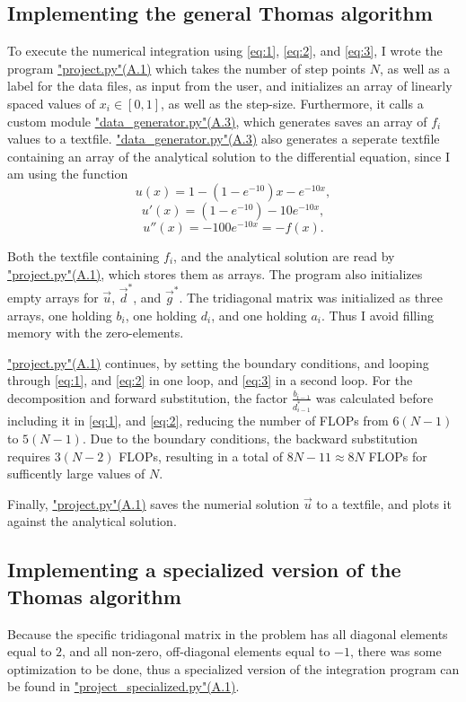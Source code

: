 \documentclass[english,notitlepage,reprint]{revtex4-1}  %
\begin{document}
\subsection{Implementing the general Thomas algorithm}\label{subsec:31}
To execute the numerical integration using \eqref{eq:1}, \eqref{eq:2}, and \eqref{eq:3}, I wrote the program \hyperref[A:1]{"project.py"(A.1)} which takes the number of step points \(N\), as well as a label for the data files, as input from the user, and initializes an array of linearly spaced values of \(x_{i}\in[0,1]\), as well as the step-size. Furthermore, it calls a custom module \hyperref[A:3]{"data\_generator.py"(A.3)}, which generates saves an array of \(f_{i}\) values to a textfile. \hyperref[A:3]{"data\_generator.py"(A.3)} also generates a seperate textfile containing an array of the analytical solution to the differential equation, since I am using the function
$$
	u(x) = 1-(1-e^{-10})x-e^{-10x},
$$
$$
	u'(x) = (1-e^{-10})-10e^{-10x},
$$
$$
	u''(x) = -100e^{-10x}=-f(x).
$$

Both the textfile containing \(f_{i}\), and the analytical solution are read by \hyperref[A:1]{"project.py"(A.1)}, which stores them as arrays. The program also initializes empty arrays for \(\vec{u}\), \(\vec{d}^{*}\), and \(\vec{g}^{*}\). The tridiagonal matrix was initialized as three arrays, one holding \(b_{i}\), one holding \(d_{i}\), and one holding \(a_{i}\). Thus I avoid filling memory with the zero-elements.

\hyperref[A:1]{"project.py"(A.1)} continues, by setting the boundary conditions, and looping through \eqref{eq:1}, and \eqref{eq:2} in one loop, and \eqref{eq:3} in a second loop. For the decomposition and forward substitution, the factor \(\frac{b_{i-1}}{d_{i-1}^{*}}\) was calculated before including it in \eqref{eq:1}, and \eqref{eq:2}, reducing the number of FLOPs from \(6(N-1)\) to \(5(N-1)\). Due to the boundary conditions, the backward substitution requires \(3(N-2)\) FLOPs, resulting in a total of \(8N-11\approx 8N\) FLOPs for sufficently large values of \(N\).

Finally, \hyperref[A:1]{"project.py"(A.1)} saves the numerial solution \(\vec{u}\) to a textfile, and plots it against the analytical solution.

\subsection{Implementing a specialized version of the Thomas algorithm}\label{subsec:32}
Because the specific tridiagonal matrix in the problem has all diagonal elements equal to \(2\), and all non-zero, off-diagonal elements equal to \(-1\), there was some optimization to be done, thus a specialized version of the integration program can be found in \hyperref[A:2]{"project\_specialized.py"(A.1)}.
\end{document}
